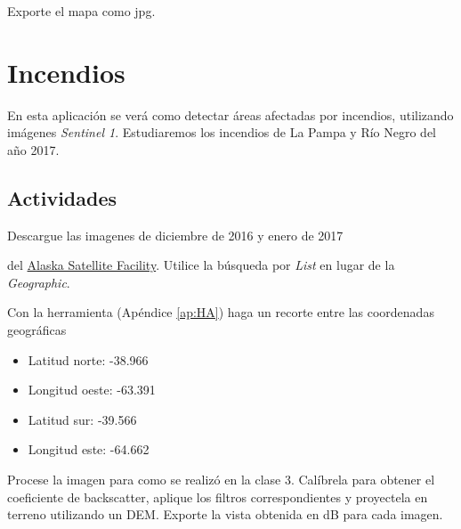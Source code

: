 \begin{que}
    Exporte el mapa como jpg.
\end{que}

\section{Incendios}
En esta aplicación se verá como detectar áreas afectadas por incendios, utilizando imágenes \emph{Sentinel 1}. Estudiaremos los incendios de La Pampa y Río Negro del año 2017.


\subsection{Actividades}

\begin{que}
    Descargue las imagenes de diciembre de 2016 y enero de 2017
    \begin{center}\end{center}
    \begin{center}\end{center}

      del \href{https://vertex.daac.asf.alaska.edu/}{Alaska Satellite Facility}. Utilice la búsqueda por \emph{List} en lugar de la \emph{Geographic}.
\end{que}

\begin{que}
    Con la herramienta  (Apéndice \ref{ap:HA}) haga un recorte entre las coordenadas geográficas
    \begin{itemize}
        \item Latitud norte: -38.966
        \item Longitud oeste: -63.391
        \item Latitud sur: -39.566
        \item Longitud este: -64.662
    \end{itemize}
\end{que}

\begin{que}
    Procese la imagen para como se realizó en la clase 3. Calíbrela para obtener el coeficiente de backscatter, aplique los filtros correspondientes y proyectela en terreno utilizando un DEM. Exporte la vista obtenida en dB para cada imagen.
\end{que}

